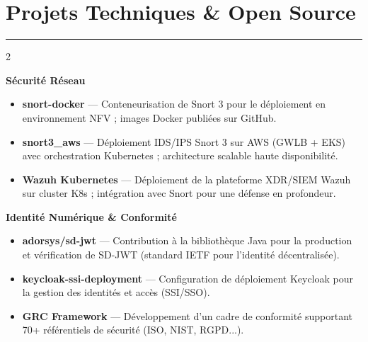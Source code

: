 \section{Projets Techniques \& Open Source}
{\color{blue} \rule{\linewidth}{1mm}}
\vspace{-3mm}
\begin{multicols}{2}

\textbf{Sécurité Réseau}
\begin{itemize}
  \item \textbf{snort-docker} — Conteneurisation de Snort 3 pour le déploiement en environnement NFV ; images Docker publiées sur GitHub.
  \item \textbf{snort3\_aws} — Déploiement IDS/IPS Snort 3 sur AWS (GWLB + EKS) avec orchestration Kubernetes ; architecture scalable haute disponibilité.
  \item \textbf{Wazuh Kubernetes} — Déploiement de la plateforme XDR/SIEM Wazuh sur cluster K8s ; intégration avec Snort pour une défense en profondeur.
\end{itemize}

\columnbreak

\textbf{Identité Numérique \& Conformité}
\begin{itemize}
  \item \textbf{adorsys/sd-jwt} — Contribution à la bibliothèque Java pour la production et vérification de SD-JWT (standard IETF pour l'identité décentralisée).
  \item \textbf{keycloak-ssi-deployment} — Configuration de déploiement Keycloak pour la gestion des identités et accès (SSI/SSO).
  \item \textbf{GRC Framework} — Développement d'un cadre de conformité supportant 70+ référentiels de sécurité (ISO, NIST, RGPD...).
\end{itemize}

\end{multicols}
